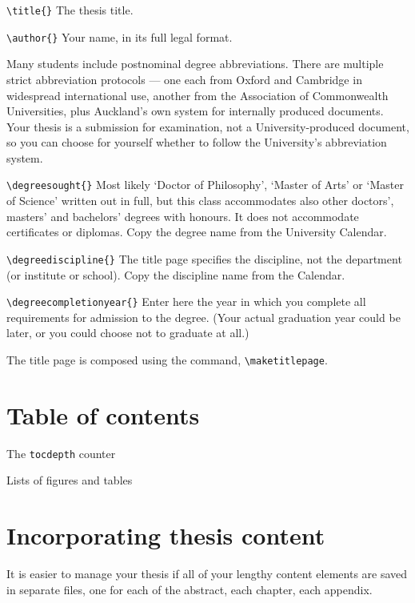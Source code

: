 \begin{description}
\item {\verb+\title{}+} The thesis title.
\item {\verb+\author{}+} Your name, in its full legal format. 

Many students include postnominal degree abbreviations. There are multiple strict abbreviation protocols — one each from Oxford and Cambridge in widespread international use, another from the Association of Commonwealth Universities, plus Auckland's own system for internally produced documents. Your thesis is a submission for examination, not a University-produced document, so you can choose for yourself whether to follow the University's abbreviation system.  
\item {\verb+\degreesought{}+} Most likely `Doctor of Philosophy', `Master of Arts' or `Master of Science' written out in full, but this class accommodates also other doctors', masters' and bachelors' degrees with honours. It does not accommodate certificates or diplomas. Copy the degree name from the University Calendar.
\item {\verb+\degreediscipline{}+} The title page specifies the discipline, not the department (or institute or school). Copy the discipline name from the Calendar.
\item {\verb+\degreecompletionyear{}+} Enter here the year in which you complete all requirements for admission to the degree. (Your actual graduation year could be later, or you could choose not to graduate at all.)
\end{description}

The title page is composed using the command, \verb+\maketitlepage+.

\section{Table of contents}
\begin{description}
\item {The \texttt{tocdepth} counter}

\item {Lists of figures and tables}
\end{description}
\section{Incorporating thesis content}
It is easier to manage your thesis if all of your lengthy content elements are saved in separate files, one for each of the abstract, each chapter, each appendix.

